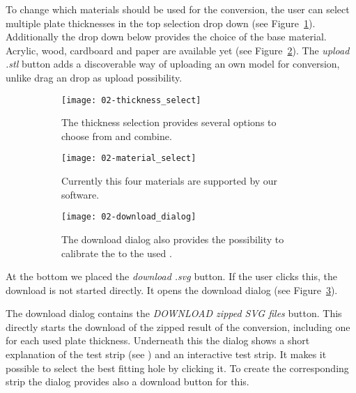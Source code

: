 \documentclass[../ClassicThesis.tex]{subfiles}
\begin{document}
To change which materials should be used for the conversion, the user can select multiple plate thicknesses in the top selection drop down (see Figure~\ref{fig:thickness_select}). Additionally the drop down below provides the choice of the base material. Acrylic, wood, cardboard and paper are available yet (see Figure~\ref{fig:material_select}). The \emph{upload .stl} button adds a discoverable way of uploading an own model for conversion, unlike drag an drop as upload possibility.

\begin{figure}
    \centering
    \begin{subfigure}[t]{0.3\textwidth}
      \centering
      \texttt{[image: 02-thickness\_select]}
      \caption{The thickness selection provides several options to choose from and combine.}
      \label{fig:thickness_select}
    \end{subfigure}
    \begin{subfigure}[t]{0.3\textwidth}
      \centering
      \texttt{[image: 02-material\_select]}
      \caption{Currently this four materials are supported by our software.}
      \label{fig:material_select}
    \end{subfigure}
    \begin{subfigure}[t]{0.3\textwidth}
      \centering
      \texttt{[image: 02-download\_dialog]}
      \caption{The download dialog also provides the possibility to calibrate the \svgfile{} to the used \lasercutter .}
      \label{fig:download_dialog}
    \end{subfigure}
    \caption{}
    \label{fig:conversion_settings}
\end{figure}

At the bottom we placed the \emph{download .svg} button. If the user clicks this, the download is not started directly. It opens the download dialog (see Figure~\ref{fig:download_dialog}).

The download dialog contains the \emph{DOWNLOAD zipped SVG files} button. This directly starts the download of the zipped result of the conversion, including one \svgfile{} for each used plate thickness. Underneath this the dialog shows a short explanation of the test strip (see ) and an interactive test strip. It makes it possible to select the best fitting hole by clicking it. To create the corresponding strip the dialog provides also a download button for this.
\end{document}
